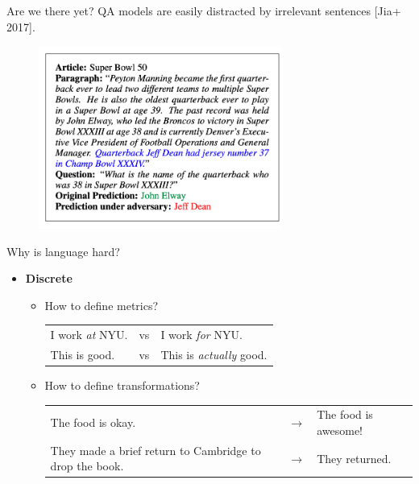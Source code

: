 \documentclass[usenames,dvipsnames,notes]{beamer}
\begin{document}
\begin{frame}
    {Are we there yet?}
    QA models are easily distracted by irrelevant sentences [Jia+ 2017].
    \begin{figure}
        \includegraphics[height=6cm]{figures/qa-adv}
    \end{figure}
\end{frame}

\begin{frame}
    {Why is language hard?}
    \pause
    \begin{itemize}
        \item \textbf{Discrete}
            \begin{itemize}
                \itemsep1em
                \item How to define metrics?
                    \medskip
                    \begin{tabular}{lcl}
                        I work \emph{at} NYU. & vs & I work \emph{for} NYU. \\
                        This is good. & vs & This is \emph{actually} good.
                    \end{tabular}
                \item How to define transformations?\\
                    \medskip
                    \begin{tabular}{p{5cm}cp{5cm}}
                    The food is okay. & $\rightarrow$ & The food is awesome! \\
                    They made a brief return to Cambridge to drop the book. & $\rightarrow$& They returned.
                    \end{tabular}
            \end{itemize}
    \end{itemize}
    \begin{table}
    \end{table}
\end{frame}
\end{document}
